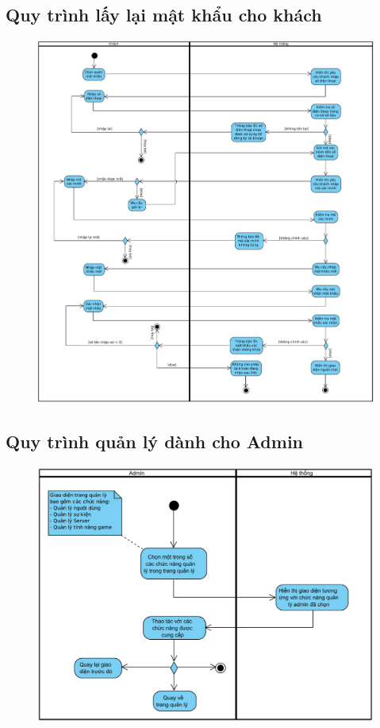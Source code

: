 \documentclass[3p]{elsarticle}
\begin{document}
\subsection{Quy trình lấy lại mật khẩu cho khách}
\begin{figure}[!htbp]
	\centering
	\includegraphics[scale=.5]{images/activities/forgetPass.pdf}
\end{figure}
%
\newpage
\subsection{Quy trình quản lý dành cho Admin}
\begin{figure}[!htbp]
	\centering
	\includegraphics[scale=.65]{images/activities/manage.pdf}
\end{figure}
%
\end{document}
